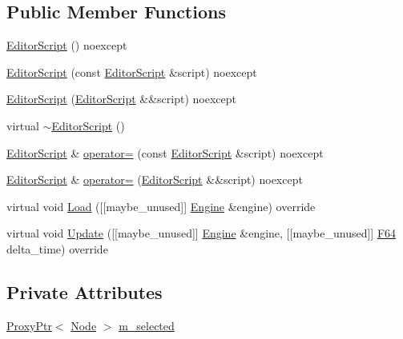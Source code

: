 \subsection*{Public Member Functions}
\begin{DoxyCompactItemize}
\item 
\hyperlink{classmage_1_1script_1_1_editor_script_a6a16b52ab1952669a597abab1d66a73d}{Editor\+Script} () noexcept
\item 
\hyperlink{classmage_1_1script_1_1_editor_script_adfe05bb0529f098c404c25326ef0fd2e}{Editor\+Script} (const \hyperlink{classmage_1_1script_1_1_editor_script}{Editor\+Script} \&script) noexcept
\item 
\hyperlink{classmage_1_1script_1_1_editor_script_ac7db9f4ad73fc58c371aaf754009404e}{Editor\+Script} (\hyperlink{classmage_1_1script_1_1_editor_script}{Editor\+Script} \&\&script) noexcept
\item 
virtual \hyperlink{classmage_1_1script_1_1_editor_script_a1454bd68e4111691b6e287966dfd252a}{$\sim$\+Editor\+Script} ()
\item 
\hyperlink{classmage_1_1script_1_1_editor_script}{Editor\+Script} \& \hyperlink{classmage_1_1script_1_1_editor_script_ab7b4dda8389d07d41eba1474491b4a36}{operator=} (const \hyperlink{classmage_1_1script_1_1_editor_script}{Editor\+Script} \&script) noexcept
\item 
\hyperlink{classmage_1_1script_1_1_editor_script}{Editor\+Script} \& \hyperlink{classmage_1_1script_1_1_editor_script_a87df2b20fee97f6aa9e09b4b5c9282a5}{operator=} (\hyperlink{classmage_1_1script_1_1_editor_script}{Editor\+Script} \&\&script) noexcept
\item 
virtual void \hyperlink{classmage_1_1script_1_1_editor_script_af0804c603852f556d362f43e69240b2d}{Load} (\mbox{[}\mbox{[}maybe\+\_\+unused\mbox{]}\mbox{]} \hyperlink{classmage_1_1_engine}{Engine} \&engine) override
\item 
virtual void \hyperlink{classmage_1_1script_1_1_editor_script_a6212864947b7db1a01b19d2683106b36}{Update} (\mbox{[}\mbox{[}maybe\+\_\+unused\mbox{]}\mbox{]} \hyperlink{classmage_1_1_engine}{Engine} \&engine, \mbox{[}\mbox{[}maybe\+\_\+unused\mbox{]}\mbox{]} \hyperlink{namespacemage_ad26233bbec640deda836e572c1a23708}{F64} delta\+\_\+time) override
\end{DoxyCompactItemize}
\subsection*{Private Attributes}
\begin{DoxyCompactItemize}
\item 
\hyperlink{classmage_1_1_proxy_ptr}{Proxy\+Ptr}$<$ \hyperlink{classmage_1_1_node}{Node} $>$ \hyperlink{classmage_1_1script_1_1_editor_script_a60a8044379dfd203ad372dabb5c03380}{m\+\_\+selected}
\end{DoxyCompactItemize}
